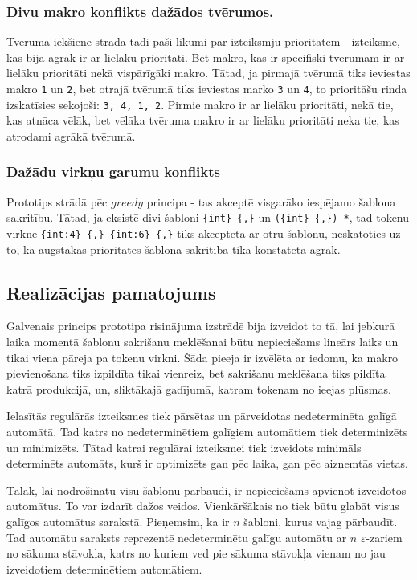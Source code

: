 \subsubsection{Divu makro konflikts dažādos tvērumos.}

Tvēruma iekšienē strādā tādi paši likumi par izteiksmju prioritātēm - izteiksme, kas bija agrāk ir ar lielāku prioritāti. Bet makro, kas ir specifiski tvērumam ir ar lielāku prioritāti nekā vispārīgāki makro. Tātad, ja pirmajā tvērumā tiks ieviestas makro \verb|1| un \verb|2|, bet otrajā tvērumā tiks ieviestas marko \verb|3| un \verb|4|, to prioritāšu rinda izskatīsies sekojoši: \verb|3, 4, 1, 2|. Pirmie makro ir ar lielāku prioritāti, nekā tie, kas atnāca vēlāk, bet vēlāka tvēruma makro ir ar lielāku prioritāti neka tie, kas atrodami agrākā tvērumā.

\subsubsection{Dažādu virkņu garumu konflikts}
Prototips strādā pēc $greedy$ principa - tas akceptē visgarāko iespējamo šablona sakritību. Tātad, ja eksistē divi šabloni \verb|{int} {,}| un \verb|({int} {,}) *|, tad tokenu virkne \verb|{int:4} {,} {int:6} {,}| tiks akceptēta ar otru šablonu, neskatoties uz to, ka augstākās prioritātes šablona sakritība tika konstatēta agrāk.

\subsection{\label{subsec:solution_motivation}Realizācijas pamatojums}

Galvenais princips prototipa risinājuma izstrādē bija izveidot to tā, lai jebkurā laika momentā šablonu sakrišanu meklēšanai būtu nepieciešams lineārs laiks un tikai viena pāreja pa tokenu virkni. Šāda pieeja ir izvēlēta ar iedomu, ka makro pievienošana tiks izpildīta tikai vienreiz, bet sakrišanu meklēšana tiks pildīta katrā produkcijā, un, sliktākajā gadījumā, katram tokenam no ieejas plūsmas.

Ielasītās regulārās izteiksmes tiek pārsētas un pārveidotas nedeterminēta galīgā automātā. Tad katrs no nedeterminētiem galīgiem automātiem tiek determinizēts un minimizēts. Tātad katrai regulārai izteiksmei tiek izveidots minimāls determinēts automāts, kurš ir optimizēts gan pēc laika, gan pēc aizņemtās vietas.

Tālāk, lai nodrošinātu visu šablonu pārbaudi, ir nepieciešams apvienot izveidotos automātus. To var izdarīt dažos veidos. Vienkāršākais no tiek būtu glabāt visus galīgos automātus sarakstā. Pieņemsim, ka ir $n$ šabloni, kurus vajag pārbaudīt. Tad automātu saraksts reprezentē nedeterminētu galīgu automātu ar $n$ $\varepsilon$-zariem no sākuma stāvokļa, katrs no kuriem ved pie sākuma stāvokļa vienam no jau izveidotiem determinētiem automātiem.

